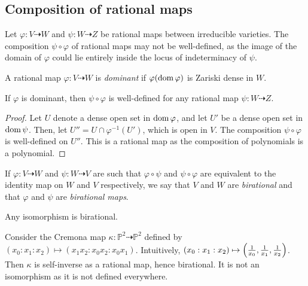 \subsection{Composition of rational maps}
Let \( \varphi \colon V \dashrightarrow W \) and \( \psi \colon W \dashrightarrow Z \) be rational maps between irreducible varieties.
The composition \( \psi \circ \varphi \) of rational maps may not be well-defined, as the image of the domain of \( \varphi \) could lie entirely inside the locus of indeterminacy of \( \psi \).
\begin{definition}
    A rational map \( \varphi \colon V \dashrightarrow W \) is \emph{dominant} if \( \varphi(\operatorname{dom} \varphi) \) is Zariski dense in \( W \).
\end{definition}
\begin{proposition}
    If \( \varphi \) is dominant, then \( \psi \circ \varphi \) is well-defined for any rational map \( \psi \colon W \dashrightarrow Z \).
\end{proposition}
\begin{proof}
    Let \( U \) denote a dense open set in \( \operatorname{dom} \varphi \), and let \( U' \) be a dense open set in \( \operatorname{dom} \psi \).
    Then, let \( U'' = U \cap \varphi^{-1}(U') \), which is open in \( V \).
    The composition \( \psi \circ \varphi \) is well-defined on \( U'' \).
    This is a rational map as the composition of polynomials is a polynomial.
\end{proof}
\begin{definition}
    If \( \varphi \colon V \dashrightarrow W \) and \( \psi \colon W \dashrightarrow V \) are such that \( \varphi \circ \psi \) and \( \psi \circ \varphi \) are equivalent to the identity map on \( W \) and \( V \) respectively, we say that \( V \) and \( W \) are \emph{birational} and that \( \varphi \) and \( \psi \) are \emph{birational maps}.
\end{definition}
\begin{example}
    Any isomorphism is birational.
\end{example}
\begin{example}
    Consider the Cremona map \( \kappa \colon \mathbb P^2 \dashrightarrow \mathbb P^2 \) defined by \( (x_0 : x_1 : x_2) \mapsto (x_1 x_2 : x_0 x_2 : x_0 x_1) \).
    Intuitively, \( (x_0 : x_1 : x_2) \mapsto \qty(\frac{1}{x_0}, \frac{1}{x_1}, \frac{1}{x_2}) \).
    Then \( \kappa \) is self-inverse as a rational map, hence birational.
    It is not an isomorphism as it is not defined everywhere.
\end{example}
